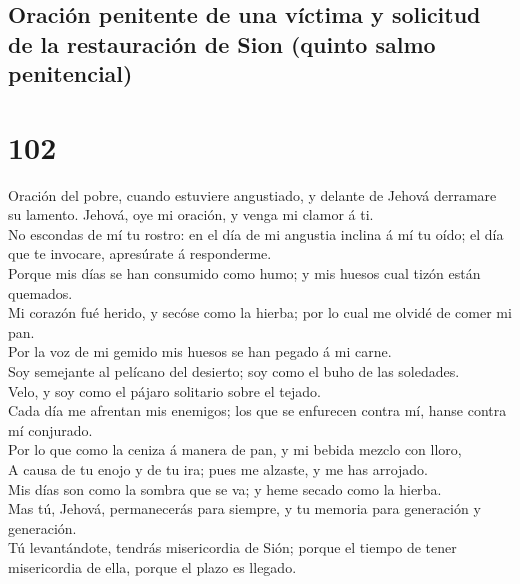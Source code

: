 \hypertarget{oraciuxf3n-penitente-de-una-vuxedctima-y-solicitud-de-la-restauraciuxf3n-de-sion-quinto-salmo-penitencial}{%
\subsection{Oración penitente de una víctima y solicitud de la
restauración de Sion (quinto salmo
penitencial)}\label{oraciuxf3n-penitente-de-una-vuxedctima-y-solicitud-de-la-restauraciuxf3n-de-sion-quinto-salmo-penitencial}}

\hypertarget{section-19-102}{%
\section{102}\label{section-19-102}}

 Oración del pobre, cuando estuviere angustiado, y delante
de Jehová derramare su lamento. Jehová, oye mi oración, y venga mi
clamor á ti.\\
 No escondas de mí tu rostro: en el día de mi angustia
inclina á mí tu oído; el día que te invocare, apresúrate á
responderme.\\
 Porque mis días se han consumido como humo; y mis huesos
cual tizón están quemados.\\
 Mi corazón fué herido, y secóse como la hierba; por lo
cual me olvidé de comer mi pan.\\
 Por la voz de mi gemido mis huesos se han pegado á mi
carne.\\
 Soy semejante al pelícano del desierto; soy como el buho
de las soledades.\\
 Velo, y soy como el pájaro solitario sobre el tejado.\\
 Cada día me afrentan mis enemigos; los que se enfurecen
contra mí, hanse contra mí conjurado.\\
 Por lo que como la ceniza á manera de pan, y mi bebida
mezclo con lloro,\\
 A causa de tu enojo y de tu ira; pues me alzaste, y me
has arrojado.\\
 Mis días son como la sombra que se va; y heme secado
como la hierba.\\
 Mas tú, Jehová, permanecerás para siempre, y tu memoria
para generación y generación.\\
 Tú levantándote, tendrás misericordia de Sión; porque el
tiempo de tener misericordia de ella, porque el plazo es llegado.\\
